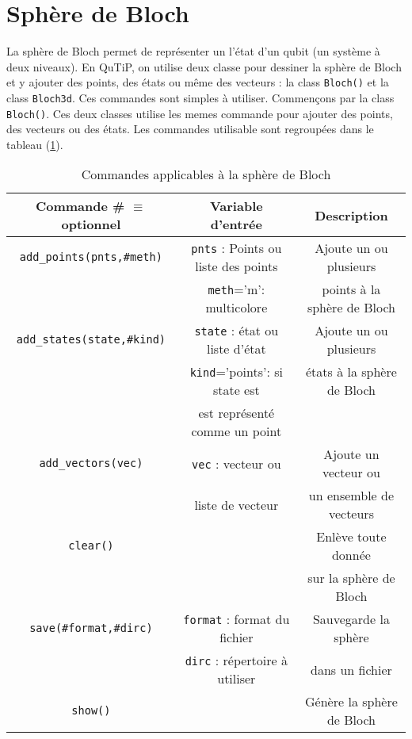 \section{Sphère de Bloch}
La sphère de Bloch permet de représenter un l'état d'un qubit (un système à deux niveaux). En QuTiP, on utilise deux classe pour dessiner la sphère de Bloch et y ajouter des points, des états ou même des vecteurs : la class \texttt{Bloch()} et la class \texttt{Bloch3d}. Ces commandes sont simples à utiliser. Commençons par la class \texttt{Bloch()}. Ces deux classes utilise les memes commande pour ajouter des points, des vecteurs ou des états. Les commandes utilisable sont regroupées dans le tableau (\ref{Bloch}).
\begin{table}[!h]
\begin{center}
\begin{tabular}{|c|c|c|}\hline \hline
\textbf{Commande \# $\equiv$ optionnel} & \textbf{Variable d'entrée} & \textbf{Description} \\ \hline \hline
\texttt{add\_points(pnts,\#meth)} & \texttt{pnts} : Points ou liste des points & Ajoute un ou plusieurs\\
 & \texttt{meth}='m': multicolore & points à la sphère de Bloch \\ \hline
\texttt{add\_states(state,\#kind)} & \texttt{state} : état ou liste d'état & Ajoute un ou plusieurs \\
 & \texttt{kind}='points': si state est & états à la sphère de Bloch \\
 & est représenté comme un point & \\ \hline
\texttt{add\_vectors(vec)} & \texttt{vec} : vecteur ou & Ajoute un vecteur ou \\
 & liste de vecteur & un ensemble de vecteurs \\ \hline
\texttt{clear()} & & Enlève toute donnée \\
 & & sur la sphère de Bloch \\ \hline
\texttt{save(\#format,\#dirc)} & \texttt{format} : format du fichier & Sauvegarde la sphère \\
 & \texttt{dirc} : répertoire à utiliser & dans un fichier \\ \hline
\texttt{show()} & & Génère la sphère de Bloch\\ \hline
\end{tabular}
\end{center}
\caption{Commandes applicables à la sphère de Bloch}
\label{Bloch}
\end{table}


